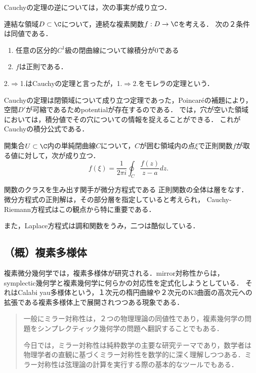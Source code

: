 \documentclass[uplatex, dvipdfmx]{jsreport}
\begin{document}
Cauchyの定理の逆については，次の事実が成り立つ．
\begin{theorem}
    連結な領域$D\subset\C$について，連続な複素関数$f:D\to\C$を考える．
    次の２条件は同値である．
    \begin{enumerate}
        \item 任意の区分的$C^1$級の閉曲線について線積分が$0$である
        \item $f$は正則である．
    \end{enumerate}
    2.$\Rightarrow$1.はCauchyの定理と言ったが，1.$\Rightarrow$2.をモレラの定理という．
\end{theorem}

Cauchyの定理は閉領域について成り立つ定理であった，Poincaréの補題により，空間$D'$が可縮であるためpotentialが存在するのである．
では，穴が空いた領域においては，積分値でその穴についての情報を捉えることができる．
これがCauchyの積分公式である．
\begin{theorem}
    開集合$U\subset\C$内の単純閉曲線$C$について，$C$が囲む領域内の点$\xi$で正則関数$f$が取る値に対して，次が成り立つ．
    \[ f(\xi) = \frac{1}{2\pi i}\oint_C\frac{f(z)}{z-a}dz. \]
\end{theorem}

\begin{itembox}[l]{関数のクラスを生み出す関手が微分方程式である}
    正則関数の全体は層をなす．
    微分方程式の正則解は，その部分層を指定していると考えられ，
    Cauchy-Riemann方程式はこの観点から特に重要である．

    また，Laplace方程式は調和関数をうみ，二つは酷似している．
\end{itembox}

\subsection{（概）複素多様体}

複素微分幾何学では，複素多様体が研究される．mirror対称性からは，symplectic幾何学と複素幾何学に何らかの対応性を定式化しようとしている．
それはCalabi yau多様体という，１次元の楕円曲線や２次元のK3曲面の高次元への拡張である複素多様体上で展開されつつある現象である．
\begin{quotation}
    一般にミラー対称性は，２つの物理理論の同値性であり，複素幾何学の問題をシンプレクティック幾何学の問題へ翻訳することでもある．

    今日では，ミラー対称性は純粋数学の主要な研究テーマであり，数学者は物理学者の直観に基づくミラー対称性を数学的に深く理解しつつある．ミラー対称性は弦理論の計算を実行する際の基本的なツールでもある．
\end{quotation}
\end{document}

